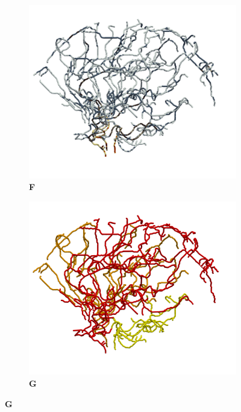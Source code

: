 \documentclass{article}
\begin{document}
\begin{figure}[t!]
\begin{subfigure}{0.32\textwidth}
\caption*{\bf F}
\vspace{-2em}
\includegraphics[width=\textwidth]{../figures/arteries_radius_+x.png}
\end{subfigure}
\hfill
\begin{subfigure}{0.32\textwidth}
\caption*{\bf G}
\vspace{-2em}
\includegraphics[width=\textwidth]{../figures/supply_node_proximity_trees_+x.png}
\end{subfigure}

\end{figure}
\end{document}
